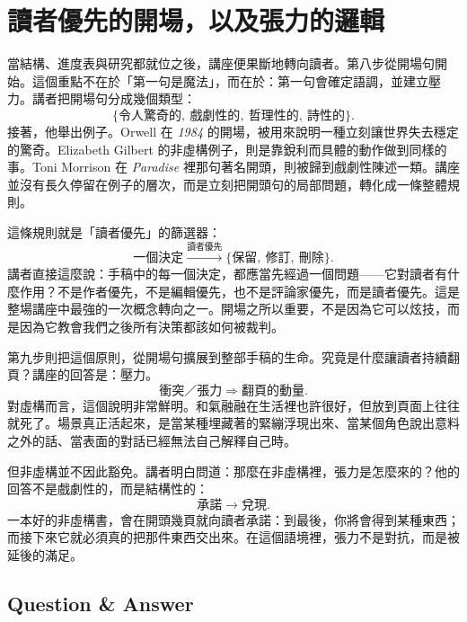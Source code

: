 \section{讀者優先的開場，以及張力的邏輯}

當結構、進度表與研究都就位之後，講座便果斷地轉向讀者。第八步從開場句開始。這個重點不在於「第一句是魔法」，而在於：第一句會確定語調，並建立壓力。講者把開場句分成幾個類型：
\begin{equation}
\{\text{令人驚奇的},\ \text{戲劇性的},\ \text{哲理性的},\ \text{詩性的}\}.
\end{equation}
接著，他舉出例子。Orwell 在 \textit{1984} 的開場，被用來說明一種立刻讓世界失去穩定的驚奇。Elizabeth Gilbert 的非虛構例子，則是靠銳利而具體的動作做到同樣的事。Toni Morrison 在 \textit{Paradise} 裡那句著名開頭，則被歸到戲劇性陳述一類。講座並沒有長久停留在例子的層次，而是立刻把開頭句的局部問題，轉化成一條整體規則。

這條規則就是「讀者優先」的篩選器：
\begin{equation}
\text{一個決定} \xrightarrow{\text{讀者優先}} \{\text{保留},\ \text{修訂},\ \text{刪除}\}.
\end{equation}
講者直接這麼說：手稿中的每一個決定，都應當先經過一個問題——它對讀者有什麼作用？不是作者優先，不是編輯優先，也不是評論家優先，而是讀者優先。這是整場講座中最強的一次概念轉向之一。開場之所以重要，不是因為它可以炫技，而是因為它教會我們之後所有決策都該如何被裁判。

第九步則把這個原則，從開場句擴展到整部手稿的生命。究竟是什麼讓讀者持續翻頁？講座的回答是：壓力。
\begin{equation}
\text{衝突／張力} \Rightarrow \text{翻頁的動量}.
\end{equation}
對虛構而言，這個說明非常鮮明。和氣融融在生活裡也許很好，但放到頁面上往往就死了。場景真正活起來，是當某種埋藏著的緊繃浮現出來、當某個角色說出意料之外的話、當表面的對話已經無法自己解釋自己時。

但非虛構並不因此豁免。講者明白問道：那麼在非虛構裡，張力是怎麼來的？他的回答不是戲劇性的，而是結構性的：
\begin{equation}
\text{承諾} \to \text{兌現}.
\end{equation}
一本好的非虛構書，會在開頭幾頁就向讀者承諾：到最後，你將會得到某種東西；而接下來它就必須真的把那件東西交出來。在這個語境裡，張力不是對抗，而是被延後的滿足。

\subsection{Question \& Answer}

